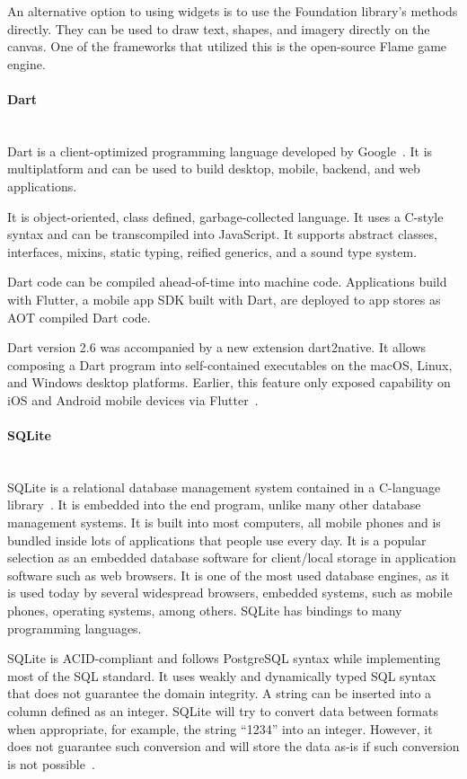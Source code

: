 An alternative option to using widgets is to use the Foundation library's methods directly. They can be used to draw text, shapes, and imagery directly on the canvas. One of the frameworks that utilized this is the open-source Flame game engine.

\paragraph{\large{Dart}}\mbox{}\\[2pt]
Dart is a client-optimized programming language developed by Google~\cite{dart}. It is multiplatform and can be used to build desktop, mobile, backend, and web applications.

It is object-oriented, class defined, garbage-collected language. It uses a C-style syntax and can be transcompiled into JavaScript. It supports abstract classes, interfaces, mixins, static typing, reified generics, and a sound type system.

Dart code can be compiled ahead-of-time into machine code. Applications build with Flutter, a mobile app SDK built with Dart, are deployed to app stores as AOT compiled Dart code.

Dart version 2.6 was accompanied by a new extension dart2native. It allows composing a Dart program into self-contained executables on the macOS, Linux, and Windows desktop platforms. Earlier, this feature only exposed capability on iOS and Android mobile devices via Flutter~\cite{dart-wiki}.

\paragraph{\large{SQLite}}\mbox{}\\[2pt]
SQLite is a relational database management system contained in a C-language library~\cite{sqlite}. It is embedded into the end program, unlike many other database management systems. It is built into most computers, all mobile phones and is bundled inside lots of applications that people use every day. It is a popular selection as an embedded database software for client/local storage in application software such as web browsers. It is one of the most used database engines, as it is used today by several widespread browsers, embedded systems, such as mobile phones, operating systems, among others. SQLite has bindings to many programming languages.

SQLite is ACID-compliant and follows PostgreSQL syntax while implementing most of the SQL standard. It uses weakly and dynamically typed SQL syntax that does not guarantee the domain integrity. A string can be inserted into a column defined as an integer. SQLite will try to convert data between formats when appropriate, for example, the string ``1234'' into an integer. However, it does not guarantee such conversion and will store the data as-is if such conversion is not possible~\cite{sqlite-wiki}.

